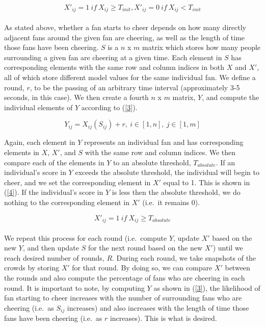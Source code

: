 \documentclass[oneside,12pt]{report}
\begin{document}
\begin{equation}
X'_{ij}=1~if~X_{ij}\geq T_{init}, X'_{ij}=0~if~X_{ij}<T_{init}
\label{2}
\end{equation}

\paragraph{}
As stated above, whether a fan starts to cheer depends on how many directly adjacent fans around the given fan are cheering, as well as the length of time those fans have been cheering. $S$ is a $n$ x $m$ matrix which stores how many people surrounding a given fan are cheering at a given time. Each element in $S$ has corresponding elements with the same row and column indices in both $X$ and $X'$, all of which store different model values for the same individual fan. We define a round, $r$, to be the passing of an arbitrary time interval (approximately 3-5 seconds, in this case). We then create a fourth $n$ x $m$ matrix, $Y$, and compute the individual elements of $Y$ according to (\ref{3}). 

\begin{equation}
Y_{ij}=X_{ij}(S_{ij})+r,~i\in[1,n],~j\in[1,m]
\label{3}
\end{equation}

Again, each element in $Y$ represents an individual fan and has corresponding elements in $X$, $X'$, and $S$ with the same row and column indices. We then compare each of the elements in $Y$ to an absolute threshold, $T_{absolute}$. If an individual's score in $Y$ exceeds the absolute threshold, the individual will begin to cheer, and we set the corresponding element in $X'$ equal to 1. This is shown in (\ref{4}). If the individual's score in $Y$ is less then the absolute threshold, we do nothing to the corresponding element in $X'$ (i.e.~it remains 0).  

\begin{equation}
X'_{ij}=1~if~X_{ij}\geq T_{absolute}
\label{4}
\end{equation}

\paragraph{}
We repeat this process for each round (i.e.~compute $Y$, update $X'$ based on the new $Y$, and then update $S$ for the next round based on the new $X'$) until we reach desired number of rounds, $R$. During each round, we take snapshots of the crowds by storing $X'$ for that round. By doing so, we can compare $X'$ between the rounds and also compute the percentage of fans who are cheering in each round. It is important to note, by computing $Y$ as shown in (\ref{3}), the likelihood of fan starting to cheer increases with the number of surrounding fans who are cheering (i.e.~as $S_{ij}$ increases) and also increases with the length of time those fans have been cheering (i.e.~as $r$ increases). This is what is desired.
\end{document}
